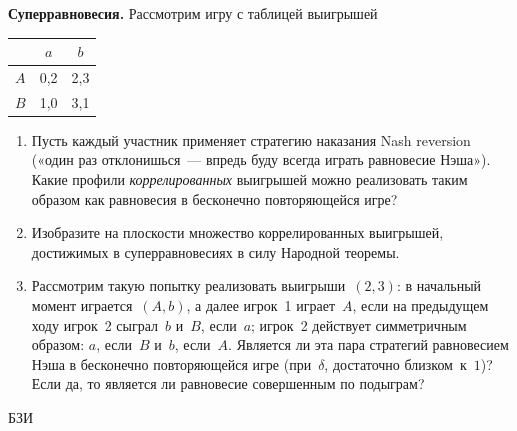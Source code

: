 \begin{problem}
 {\bf Суперравновесия.} Рассмотрим игру с таблицей
выигрышей \begin{center}
\begin{tabular}{|c|cc|}
\hline &$a$&$b$\\ \hline $A$&0,2&2,3\\ $B$&1,0&3,1\\ \hline
\end{tabular}
\end{center}

\begin{enumerate}

\item Пусть каждый участник применяет стратегию наказания
Nash reversion («один раз отклонишься~--- впредь буду
всегда играть равновесие Нэша»). Какие профили {\em
коррелированных} выигрышей можно реализовать таким образом
как равновесия в бесконечно повторяющейся игре?

\item Изобразите на плоскости множество коррелированных
выигрышей, достижимых в суперравновесиях в силу Народной
теоремы.

\item Рассмотрим такую попытку реализовать
выигрыши~$(2,3)$: в начальный момент играется~$(A,b)$, а
далее игрок~1 играет~$A$, если на предыдущем ходу игрок~2
сыграл~$b$ и~$B$, если~$a$; игрок~2 действует симметричным
образом: $a$, если~$B$ и~$b$, если~$A$. Является ли эта
пара стратегий равновесием Нэша в бесконечно повторяющейся
игре (при~$\delta$, достаточно близком~к~$1$)? Если да, то
является ли равновесие совершенным по подыграм?

\end{enumerate}



\begin{source}
БЗИ
\end{source}


\begin{sol}

\end{sol}
\end{problem}




